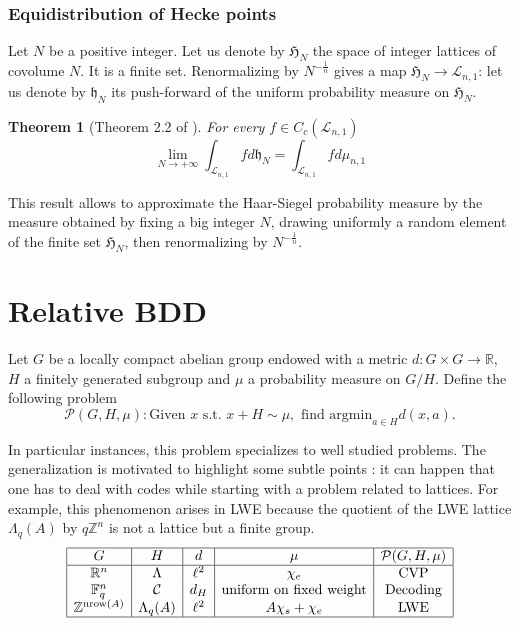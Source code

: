 \documentclass{article}
\newtheorem{theorem}{Theorem}
\begin{document}
\subsubsection{Equidistribution of Hecke points}
Let $N$ be a positive integer. Let us denote by $\mathfrak H_N$ the space of integer lattices of covolume $N$. It is a finite set. Renormalizing by $N^{-\frac{1}{n}}$ gives a map $\mathfrak H_N \rightarrow \mathcal L_{n,1}$: let us denote by $\mathfrak h_{N}$ its push-forward of the uniform probability measure on $\mathfrak H_N$. 

\begin{theorem}[Theorem 2.2 of \cite{goldstein2003equidistribution}]
For every $f\in C_c(\mathcal L_{n,1})$
\[\lim_{N\rightarrow +\infty} \int_{\mathcal L_{n,1}} f d\mathfrak h_{N} = \int_{\mathcal L_{n,1}} fd\mu_{n,1}\]
\end{theorem}

This result allows to approximate the Haar-Siegel probability measure by the measure obtained by fixing a big integer $N$, drawing uniformly a random element of the finite set $\mathfrak H_N$, then renormalizing by $N^{-\frac{1}{n}}$.

\section{Relative BDD}%

Let $G$ be a locally compact abelian group endowed with a metric $d : G\times G \rightarrow \mathbb R$, $H$ a finitely generated subgroup and $\mu$ a probability measure on $G/H$. Define the following problem
$$\mathcal P (G,H,\mu) : \text{Given } x \text{ s.t. }x+H \sim \mu , \text{ find argmin}_{a\in H} d(x,a).$$

In particular instances, this problem specializes to well studied problems. The generalization is motivated to highlight some subtle points : it can happen that one has to deal with codes while starting with a problem related to lattices. For example, this phenomenon arises in LWE because the quotient of the LWE lattice $\Lambda_q(A)$ by $q\mathbb Z^n$ is not a lattice but a finite group. 
\[\begin{array}{|c|c|c| c | c|} 
\hline
G             & H                          & d     &  \mu              & \mathcal P (G,H,\mu)\\
\hline
\mathbb R^n   & \Lambda                    & \ell^2 & \chi_e            & \text{CVP}     \\
\mathbb F_q^n & \mathcal C                 & d_H    & \text{uniform on fixed weight}    & \text{Decoding}\\
\mathbb Z^{\text{nrow}(A)}  & \Lambda_q(A) & \ell^2 &  A \chi_s +\chi_e & \text{LWE}     \\
\hline
\end{array}\]
\end{document}
